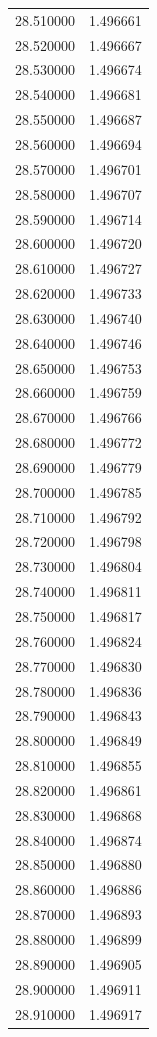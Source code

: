 \begin{tabular}{rr}
28.510000 & 1.496661 \\
28.520000 & 1.496667 \\
28.530000 & 1.496674 \\
28.540000 & 1.496681 \\
28.550000 & 1.496687 \\
28.560000 & 1.496694 \\
28.570000 & 1.496701 \\
28.580000 & 1.496707 \\
28.590000 & 1.496714 \\
28.600000 & 1.496720 \\
28.610000 & 1.496727 \\
28.620000 & 1.496733 \\
28.630000 & 1.496740 \\
28.640000 & 1.496746 \\
28.650000 & 1.496753 \\
28.660000 & 1.496759 \\
28.670000 & 1.496766 \\
28.680000 & 1.496772 \\
28.690000 & 1.496779 \\
28.700000 & 1.496785 \\
28.710000 & 1.496792 \\
28.720000 & 1.496798 \\
28.730000 & 1.496804 \\
28.740000 & 1.496811 \\
28.750000 & 1.496817 \\
28.760000 & 1.496824 \\
28.770000 & 1.496830 \\
28.780000 & 1.496836 \\
28.790000 & 1.496843 \\
28.800000 & 1.496849 \\
28.810000 & 1.496855 \\
28.820000 & 1.496861 \\
28.830000 & 1.496868 \\
28.840000 & 1.496874 \\
28.850000 & 1.496880 \\
28.860000 & 1.496886 \\
28.870000 & 1.496893 \\
28.880000 & 1.496899 \\
28.890000 & 1.496905 \\
28.900000 & 1.496911 \\
28.910000 & 1.496917 \\

\end{tabular}
